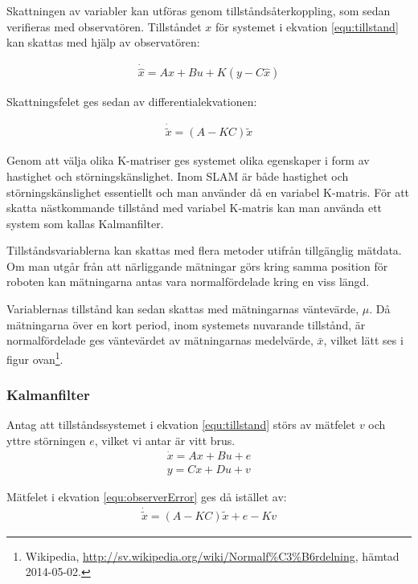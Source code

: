 \documentclass[a4paper,12pt,fleqn]{article}
\begin{document}
Skattningen av variabler kan utföras genom tillståndsåterkoppling, som sedan verifieras med observatören.  Tillståndet $x$ för systemet i ekvation \ref{equ:tillstand} kan skattas med hjälp av observatören: 

\begin{gather}
\dot{\hat{x}} = Ax + Bu + K(y - C\hat{x})
\label{equ:observer}
\end{gather}

Skattningsfelet ges sedan av differentialekvationen: 

\begin{gather}
\dot{\tilde{x}} = (A - KC)\tilde{x}
\label{equ:observerError}
\end{gather}

Genom att välja olika K-matriser ges systemet olika egenskaper i form av hastighet och störningskänslighet. Inom SLAM är både hastighet och störningskänslighet essentiellt och man använder då en variabel K-matris. För att skatta nästkommande tillstånd med variabel K-matris kan man använda ett system som kallas Kalmanfilter. 

Tillståndsvariablerna kan skattas med flera metoder utifrån tillgänglig mätdata. Om man utgår från att närliggande mätningar görs kring samma position för roboten kan mätningarna antas vara normalfördelade kring en viss längd. 


Variablernas tillstånd kan sedan skattas med mätningarnas väntevärde, $\mu$. Då mätningarna över en kort period, inom systemets nuvarande tillstånd, är normalfördelade ges väntevärdet av mätningarnas medelvärde, $\bar{x}$, vilket lätt ses i figur ovan\footnote{Wikipedia, \url{http://sv.wikipedia.org/wiki/Normalf\%C3\%B6rdelning}, hämtad 2014-05-02.}. 

\subsubsection{Kalmanfilter}

Antag att tillståndssystemet i ekvation \ref{equ:tillstand} störs av mätfelet $v$ och yttre störningen $e$, vilket vi antar är vitt brus.  
\begin{gather}
\dot{x}=Ax+Bu+e \\
y=Cx+Du+v
\end{gather}

Mätfelet i ekvation \ref{equ:observerError} ges då istället av: 
\begin{gather}
\dot{\tilde{x}} = (A - KC)\tilde{x} + e - Kv
\end{gather}
\end{document}
